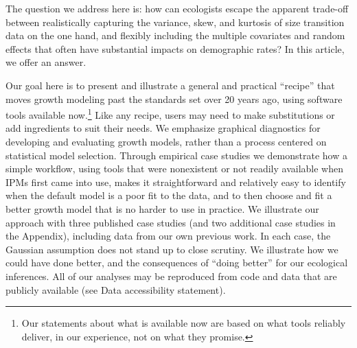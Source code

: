 \documentclass[12pt]{article}
\begin{document}
The question we address here is: how can ecologists escape the apparent trade-off between realistically capturing the variance, skew, and kurtosis of size transition data on the one hand, and flexibly including the multiple covariates and random effects that often have substantial impacts on demographic rates?   
In this article, we offer an answer. 

Our goal here is to present and illustrate a general and practical ``recipe'' that moves growth modeling past the standards set over 20 years ago, using software tools available now.\footnote{Our statements about what is available now are based on what tools reliably deliver, in our experience, not on what they promise.} 
Like any recipe, users may need to make substitutions or add ingredients to suit their needs. 
We emphasize graphical diagnostics for developing and evaluating growth models, rather than a process centered on statistical model selection. 
Through empirical case studies we demonstrate how a simple workflow, using tools that were nonexistent or not readily available when IPMs first came into use, makes it straightforward and relatively easy to identify when the default model is a poor fit to the data, and to then choose and fit a better growth model that is no harder to use in practice. 
We illustrate our approach with three published case studies (and two additional case studies in the Appendix), including data from our own previous work.
In each case, the Gaussian assumption does not stand up to close scrutiny. 
We illustrate how we could have done better, and the consequences of ``doing better'' for our ecological inferences. 
All of our analyses may be reproduced from code and data that are publicly available (see Data accessibility statement). 
\end{document}

